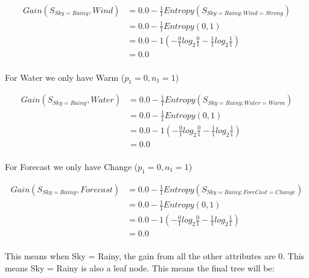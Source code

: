 \documentclass[10pt,a4paper]{article}
\begin{document}
{{{{{{{{{{\begin{equation}
\begin{split}
Gain(S_{Sky=Rainy},Wind) &= 0.0 - \frac{1}{1} Entropy(S_{Sky=Rainy;Wind=Strong} )\\
          &= 0.0 - \frac{1}{1} Entropy(0,1) \\
          &= 0.0 - 1( -\frac{0}{1} log_2\frac{0}{1} -\frac{1}{1} log_2\frac{1}{1} )  \\
          &= 0.0 \\
\end{split}
\end{equation}

For Water we only have Warm ($p_1=0,n_1=1$)

\begin{equation}
\begin{split}
Gain(S_{Sky=Rainy},Water) &= 0.0 - \frac{1}{1} Entropy(S_{Sky=Rainy;Water=Warm} )\\
          &= 0.0 - \frac{1}{1} Entropy(0,1) \\
          &= 0.0 - 1( -\frac{0}{1} log_2\frac{0}{1} -\frac{1}{1} log_2\frac{1}{1} )  \\
          &= 0.0 \\
\end{split}
\end{equation}

For Forecast we only have Change ($p_1=0,n_1=1$)

\begin{equation}
\begin{split}
Gain(S_{Sky=Rainy},Forecast) &= 0.0 - \frac{1}{1} Entropy(S_{Sky=Rainy;ForeCast=Change} )\\
          &= 0.0 - \frac{1}{1} Entropy(0,1) \\
          &= 0.0 - 1( -\frac{0}{1} log_2\frac{0}{1} -\frac{1}{1} log_2\frac{1}{1} )  \\
          &= 0.0 \\
\end{split}
\end{equation}

This means when Sky = Rainy, the gain from all the other attributes are 0. This means Sky = Rainy is also a leaf node. This means the final tree will be:


}}}}}}}}}}
\end{document}
